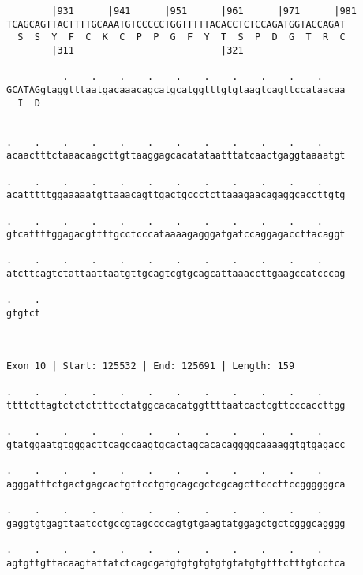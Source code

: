 \documentclass{article}
\begin{document}
\begin{Verbatim}
        |931      |941      |951      |961      |971      |981
TCAGCAGTTACTTTTGCAAATGTCCCCCTGGTTTTTACACCTCTCCAGATGGTACCAGAT
  S  S  Y  F  C  K  C  P  P  G  F  Y  T  S  P  D  G  T  R  C
        |311                          |321                  
  
          .    .    .    .    .    .    .    .    .    .    
GCATAGgtaggtttaatgacaaacagcatgcatggtttgtgtaagtcagttccataacaa
  I  D                                                      
                                                            
  
.    .    .    .    .    .    .    .    .    .    .    .    
acaactttctaaacaagcttgttaaggagcacatataatttatcaactgaggtaaaatgt
                                                            
.    .    .    .    .    .    .    .    .    .    .    .    
acatttttggaaaaatgttaaacagttgactgccctcttaaagaacagaggcaccttgtg
                                                            
.    .    .    .    .    .    .    .    .    .    .    .    
gtcattttggagacgttttgcctcccataaaagagggatgatccaggagaccttacaggt
                                                            
.    .    .    .    .    .    .    .    .    .    .    .    
atcttcagtctattaattaatgttgcagtcgtgcagcattaaaccttgaagccatcccag
                                                            
.    .
gtgtct
      
      
 
Exon 10 | Start: 125532 | End: 125691 | Length: 159
 
.    .    .    .    .    .    .    .    .    .    .    .    
ttttcttagtctctcttttcctatggcacacatggttttaatcactcgttcccaccttgg
                                                            
.    .    .    .    .    .    .    .    .    .    .    .    
gtatggaatgtgggacttcagccaagtgcactagcacacaggggcaaaaggtgtgagacc
                                                            
.    .    .    .    .    .    .    .    .    .    .    .    
agggatttctgactgagcactgttcctgtgcagcgctcgcagcttcccttccggggggca
                                                            
.    .    .    .    .    .    .    .    .    .    .    .    
gaggtgtgagttaatcctgccgtagccccagtgtgaagtatggagctgctcgggcagggg
                                                            
.    .    .    .    .    .    .    .    .    .    .    .    
agtgttgttacaagtattatctcagcgatgtgtgtgtgtgtatgtgtttctttgtcctca
                                                            

\end{Verbatim}
\end{document}
